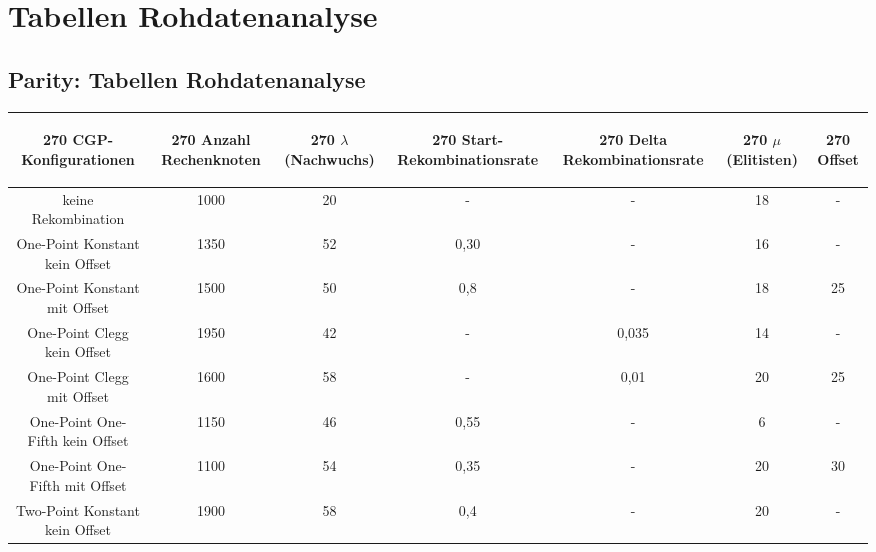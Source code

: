 \section{Tabellen Rohdatenanalyse}
\label{sec:tablesRohdatenanalyseAppendix}

\subsection{Parity: Tabellen Rohdatenanalyse}
\label{subsec:appendixTabellenRohdatenanalyseParity}

\begin{table}[H]
	\centering
	\begin{tabular}{c | c | c | c | c | c | c}
		\begin{turn}{270} \textbf{CGP-Konfigurationen} \end{turn} & \begin{turn}{270} \textbf{Anzahl Rechenknoten} \end{turn} & \begin{turn}{270} \textbf{$\lambda$ (Nachwuchs)} \end{turn} & \begin{turn}{270} \textbf{Start-Rekombinationsrate} \end{turn} & \begin{turn}{270} \textbf{Delta Rekombinationsrate} \end{turn} & \begin{turn}{270} \textbf{$\mu$ (Elitisten)} \end{turn} & \begin{turn}{270} \textbf{Offset} \end{turn}\\
		\hline
		keine Rekombination & 1000 & 20 & - & - & 18 & -\\
		\hline
		One-Point Konstant kein Offset & 1350 & 52 & 0,30 & - & 16 & - \\
		\hline
		One-Point Konstant mit Offset & 1500 & 50 & 0,8 & - & 18 & 25 \\
		\hline
		One-Point Clegg kein Offset & 1950 & 42 & - & 0,035 & 14 & - \\
		\hline
		One-Point Clegg mit Offset & 1600 & 58 & - & 0,01 & 20 & 25 \\
		\hline
		One-Point One-Fifth kein Offset & 1150 & 46 & 0,55 & - & 6 & - \\
		\hline
		One-Point One-Fifth mit Offset & 1100 & 54 & 0,35 & - & 20 & \color{red}30\color{black} \\
		\hline
		Two-Point Konstant kein Offset & 1900 & 58 & 0,4 & - & 20 & - \\

\end{tabular}
\end{table}
